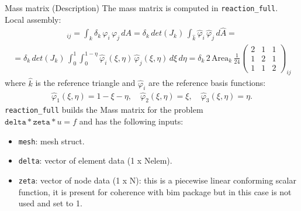 \documentclass[aspectratio=54,xcolor=dvipsnames]{beamer}
\begin{document}
\begin{frame}{Mass matrix (Description)}
    \small
    The mass matrix is computed in \texttt{reaction\_full}. \\
    Local assembly:
    \begin{align*}
        [B^{k}]_{ij}
        = \int_{k} \delta_{k}\,\varphi_i\,\varphi_j \,dA
        = \delta_{k}\,det(J_k)\,\int_{\hat{k}} \hat{\varphi}_i\,\hat{\varphi}_j \,d\hat{A} = 
    \end{align*}
    \begin{align*}
        = \delta_{k}\,det(J_k)\,\int_{0}^{1} \int_{0}^{1-\eta} \hat{\varphi}_i(\xi,\eta)\,\hat{\varphi}_j(\xi,\eta) \,d\xi\,d\eta 
        = \delta_{k}\,2\,\mathrm{Area}_{k}\,\frac{1}{24}
          \begin{pmatrix}2&1&1\\1&2&1\\1&1&2\end{pmatrix}_{ij}
    \end{align*}
    \medskip
    where $\hat{k}$ is the reference triangle and $\hat{\varphi}_i$ are the reference basis functions: 
    \begin{align*}
        \hat{\varphi}_1(\xi,\eta) = 1 - \xi - \eta, \quad
        \hat{\varphi}_2(\xi,\eta) = \xi, \quad
        \hat{\varphi}_3(\xi,\eta) = \eta.
    \end{align*}
    \texttt{reaction\_full} builds the Mass matrix for the problem \\ 
    $ \texttt{delta} * \texttt{zeta} * u = f$  
    and has the following inputs:
    \begin{itemize}
        \item \texttt{mesh}: mesh struct.
        \item \texttt{delta}: vector of element data (1 x Nelem).
        \item \texttt{zeta}: vector of node data (1 x N): this is a piecewise linear conforming scalar function, it is present for coherence with bim package but in this case is not used and set to 1.
    \end{itemize}
\end{frame}
\end{document}
